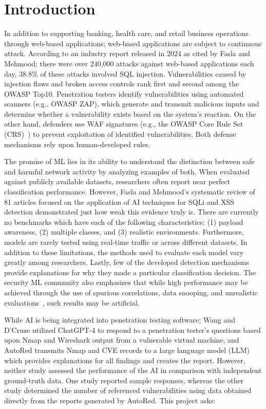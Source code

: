 \documentclass[conference]{IEEEtran}
\begin{document}
\section{Introduction}

In addition to supporting banking, health care, and retail business operations through web-based applications; web-based applications are subject to continuous attack. According to an industry report released in 2024 as cited by Fasla and Mehmood; there were over 240,000 attacks against web-based applications each day, 38.8\% of these attacks involved SQL injection\cite{fasla2026}. Vulnerabilities caused by injection flaws and broken access controls rank first and second among the OWASP Top10\cite{owasptop10}. Penetration testers identify vulnerabilities using automated scanners (e.g., OWASP ZAP\cite{zap}), which generate and transmit malicious inputs and determine whether a vulnerability exists based on the system's reaction. On the other hand, defenders use WAF signatures (e.g., the OWASP Core Rule Set (CRS)~\cite{crs}) to prevent exploitation of identified vulnerabilities. Both defense mechanisms rely upon human-developed rules.

The promise of ML lies in its ability to understand the distinction between safe and harmful network activity by analyzing examples of both. When evaluated against publicly available datasets, researchers often report near perfect classification performance\cite{tadhani2024,yang2025}. However, Fasla and Mehmood’s systematic review of 81 articles focused on the application of AI techniques for SQLi and XSS detection\cite{fasla2026} demonstrated just how weak this evidence truly is. There are currently no benchmarks which have each of the following characteristics: (1) payload awareness, (2) multiple classes, and (3) realistic environments. Furthermore, models are rarely tested using real-time traffic or across different datasets. In addition to these limitations, the methods used to evaluate each model vary greatly among researchers. Lastly, few of the developed detection mechanisms provide explanations for why they made a particular classification decision. The security ML community also emphasizes that while high performance may be achieved through the use of spurious correlations, data snooping, and unrealistic evaluations~\cite{arp2022,sommer2010}, such results may be artificial.

While AI is being integrated into penetration testing software; Wang and D'Cruze\cite{wang2024} utilized ChatGPT-4 to respond to a penetration tester's questions based upon Nmap and Wireshark output from a vulnerable virtual machine, and AutoRed\cite{khairmode2026} transmits Nmap and CVE records to a large language model (LLM) which provides explanations for all findings and creates the report. However, neither study assessed the performance of the AI in comparison with independent ground-truth data. One study reported sample responses, whereas the other study determined the number of referenced vulnerabilities using data obtained directly from the reports generated by AutoRed.
This project asks:
\end{document}
